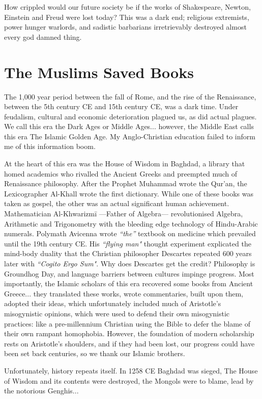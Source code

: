 How crippled would our future society be if the works of Shakespeare, Newton, Einstein and Freud were lost today? This was a dark end; religious extremists, power hunger warlords, and sadistic barbarians irretrievably destroyed almost every god damned thing.

\section{The Muslims Saved Books}

The 1,000 year period between the fall of Rome, and the rise of the Renaissance, between the 5th century CE and 15th century CE, was a dark time. Under feudalism, cultural and economic deterioration plagued us, as did actual plagues. We call this era the Dark Ages or Middle Ages... however, the Middle East calls this era The Islamic Golden Age. My Anglo-Christian education failed to inform me of this information boom. 

At the heart of this era was the House of Wisdom in Baghdad, a library that homed academics who rivalled the Ancient Greeks and preempted much of Renaissance philosophy. After the Prophet Muhammad wrote the Qur'an, the Lexicographer Al-Khall wrote the first dictionary. While one of these books was taken as gospel, the other was an actual significant human achievement. Mathematician Al-Khwarizmī ---Father of Algebra--- revolutionised Algebra, Arithmetic and Trigonometry with the bleeding edge technology of Hindu-Arabic numerals. Polymath Avicenna wrote \textit{``the''} textbook on medicine which prevailed until the 19th century CE. His \textit{``flying man"} thought experiment explicated the mind-body duality that the Christian philosopher Descartes repeated 600 years later with \textit{``Cogito Ergo Sum"}. Why does Descartes get the credit? Philosophy is Groundhog Day, and language barriers between cultures impinge progress. Most importantly, the Islamic scholars of this era recovered some books from Ancient Greece... they translated these works, wrote commentaries, built upon them, adopted their ideas, which unfortunately included much of Aristotle's misogynistic opinions, which were used to defend their own misogynistic practices: like a pre-millennium Christian using the Bible to defer the blame of their own rampant homophobia. However, the foundation of modern scholarship rests on Aristotle's shoulders, and if they had been lost, our progress could have been set back centuries, so we thank our Islamic brothers. 

Unfortunately, history repeats itself. In 1258 CE Baghdad was sieged, The House of Wisdom and its contents were destroyed, the Mongols were to blame, lead by the notorious Genghis...

